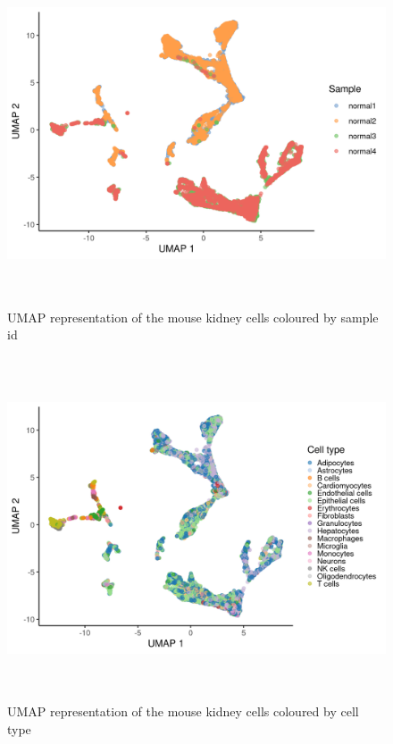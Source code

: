 \begin{figure}[!htb]
\begin{center}
\includegraphics[width=6in,height=4in]{figure/kidney_mouse/UMAP_mouse_sample_id.png}
\end{center}
\caption{UMAP representation of the mouse kidney cells coloured by sample id}
\label{fig:UMAP_mouse_sample_id}
\end{figure}
\FloatBarrier

\begin{figure}[!htb]
\begin{center}
\includegraphics[width=6in,height=4in]{figure/kidney_mouse/UMAP_mouse_cell_type.png}
\end{center}
\caption{UMAP representation of the mouse kidney cells coloured by cell type}
\label{fig:UMAP_mouse_cell_type}
\end{figure}
\FloatBarrier

